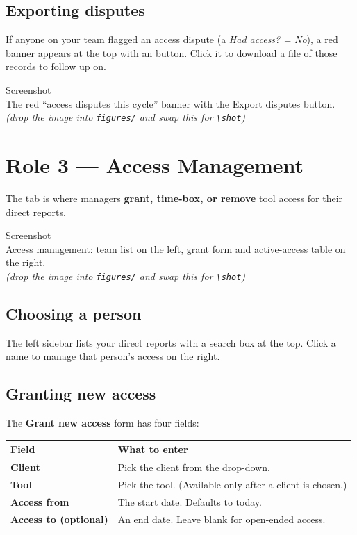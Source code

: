 \documentclass[11pt]{article}
\newcommand{\shotph}[1]{%
  \begin{center}
  \begin{tcolorbox}[enhanced, colback=soft, colframe=brand, boxrule=0pt,
       arc=4pt, left=8pt, right=8pt, top=20pt, bottom=20pt, width=\linewidth,
       borderline={0.6pt}{0pt}{brand, dashed}]
    \centering
    {\color{brand}\faImage\;\large Screenshot}\\[5pt]
    {\footnotesize\color{muted} #1}\\[3pt]
    {\scriptsize\color{muted}\itshape (drop the image into \texttt{figures/} and swap this for \texttt{{\textbackslash}shot})}
  \end{tcolorbox}
  \end{center}}
\begin{document}
\subsection{Exporting disputes}
If anyone on your team flagged an access dispute (a \emph{Had access? = No}), a red
banner appears at the top with an  button. Click
it to download a file of those records to follow up on.

\shotph{The red ``access disputes this cycle'' banner with the Export disputes button.}

\section{Role 3 --- Access Management}

The  tab is where managers \textbf{grant, time-box, or remove} tool
access for their direct reports.

\shotph{Access management: team list on the left, grant form and active-access table on the right.}

\subsection{Choosing a person}
The left sidebar lists your direct reports with a search box at the top. Click a
name to manage that person's access on the right.

\subsection{Granting new access}
The \textbf{Grant new access} form has four fields:

\begin{longtable}{>{\raggedright}p{3.6cm} p{10.9cm}}
\toprule
\textbf{Field} & \textbf{What to enter} \\
\midrule
\endhead
\textbf{Client} & Pick the client from the drop-down. \\
\addlinespace
\textbf{Tool} & Pick the tool. (Available only after a client is chosen.) \\
\addlinespace
\textbf{Access from} & The start date. Defaults to today. \\
\addlinespace
\textbf{Access to (optional)} & An end date. Leave blank for open-ended access. \\
\bottomrule
\end{longtable}
\end{document}
